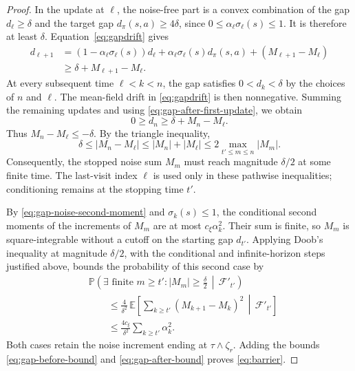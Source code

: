 \begin{proof}
In the update at $\ell$, the noise-free part is a convex combination of the gap $d_\ell\ge\delta$ and the target gap $d_\pi(s,a)\ge4\delta$, since $0\le\alpha_\ell\sigma_\ell(s)\le1$. It is therefore at least $\delta$. Equation~\eqref{eq:gapdrift} gives
\begin{equation}
\begin{aligned}
d_{\ell+1}
&=(1-\alpha_\ell\sigma_\ell(s))d_\ell
+\alpha_\ell\sigma_\ell(s)d_\pi(s,a)
+(M_{\ell+1}-M_\ell)\\
&\ge\delta+M_{\ell+1}-M_\ell.
\end{aligned}
\label{eq:gap-after-first-update}
\end{equation}
At every subsequent time $\ell<k<n$, the gap satisfies $0<d_k<\delta$ by the choices of $n$ and $\ell$. The mean-field drift in \eqref{eq:gapdrift} is then nonnegative. Summing the remaining updates and using \eqref{eq:gap-after-first-update}, we obtain
\begin{equation}
0\ge d_n\ge\delta+M_n-M_\ell.
\label{eq:gap-after-noise}
\end{equation}
Thus $M_n-M_\ell\le-\delta$. By the triangle inequality,
\begin{equation}
\delta\le|M_n-M_\ell|
\le|M_n|+|M_\ell|
\le2\max_{t'\le m\le n}|M_m|.
\label{eq:gap-after-max}
\end{equation}
Consequently, the stopped noise sum $M_m$ must reach magnitude $\delta/2$ at some finite time. The last-visit index $\ell$ is used only in these pathwise inequalities; conditioning remains at the stopping time $t'$.

By \eqref{eq:gap-noise-second-moment} and $\sigma_k(s)\le1$, the conditional second moments of the increments of $M_m$ are at most $c_\xi\alpha_k^2$. Their sum is finite, so $M_m$ is square-integrable without a cutoff on the starting gap $d_{t'}$. Applying Doob's inequality at magnitude $\delta/2$, with the conditional and infinite-horizon steps justified above, bounds the probability of this second case by
\begin{equation}
\begin{aligned}
&\mathbb P\!\left(\exists\text{ finite }m\ge t':|M_m|\ge\tfrac\delta2
\,\middle|\,\mathcal F'_{t'}\right)\\
&\qquad\le\frac{4}{\delta^2}\,
\mathbb E\!\left[\sum_{k\ge t'}(M_{k+1}-M_k)^2
\,\middle|\,\mathcal F'_{t'}\right]\\
&\qquad\le\frac{4c_\xi}{\delta^2}\sum_{k\ge t'}\alpha_k^2.
\end{aligned}
\label{eq:gap-after-bound}
\end{equation}
Both cases retain the noise increment ending at $\tau\wedge\zeta_r$. Adding the bounds \eqref{eq:gap-before-bound} and \eqref{eq:gap-after-bound} proves \eqref{eq:barrier}.
\end{proof}

